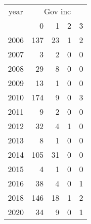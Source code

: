 \footnotesize\begin{tabular}[t]{lrrrr}
\toprule
\multicolumn{1}{c}{year} & \multicolumn{4}{c}{Gov inc} \\
\cmidrule(l{3pt}r{3pt}){1-1} \cmidrule(l{3pt}r{3pt}){2-5}
  & 0 & 1 & 2 & 3\\
\midrule
2006 & 137 & 23 & 1 & 2\\
2007 & 3 & 2 & 0 & 0\\
2008 & 29 & 8 & 0 & 0\\
2009 & 13 & 1 & 0 & 0\\
2010 & 174 & 9 & 0 & 3\\
2011 & 9 & 2 & 0 & 0\\
2012 & 32 & 4 & 1 & 0\\
2013 & 8 & 1 & 0 & 0\\
2014 & 105 & 31 & 0 & 0\\
2015 & 4 & 1 & 0 & 0\\
2016 & 38 & 4 & 0 & 1\\
2018 & 146 & 18 & 1 & 2\\
2020 & 34 & 9 & 0 & 1\\
\bottomrule
\end{tabular}
